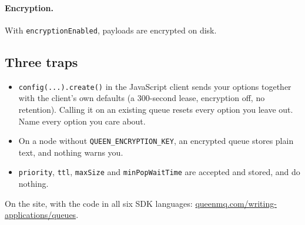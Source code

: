 \paragraph{Encryption.} With \texttt{encryptionEnabled}, payloads are encrypted on disk.


\subsection{Three traps}

\begin{itemize}
\item \texttt{config(...).create()} in the JavaScript client sends your options together with the
client's own defaults (a 300-second lease, encryption off, no retention). Calling it on an existing
queue resets every option you leave out. Name every option you care about.
\item On a node without \texttt{QUEEN\_ENCRYPTION\_KEY}, an encrypted queue stores plain text, and
nothing warns you.
\item \texttt{priority}, \texttt{ttl}, \texttt{maxSize} and \texttt{minPopWaitTime} are accepted and
stored, and do nothing.
\end{itemize}

On the site, with the code in all six SDK languages: \href{https://queenmq.com/writing-applications/queues/}{queenmq.com/writing-applications/queues}.
